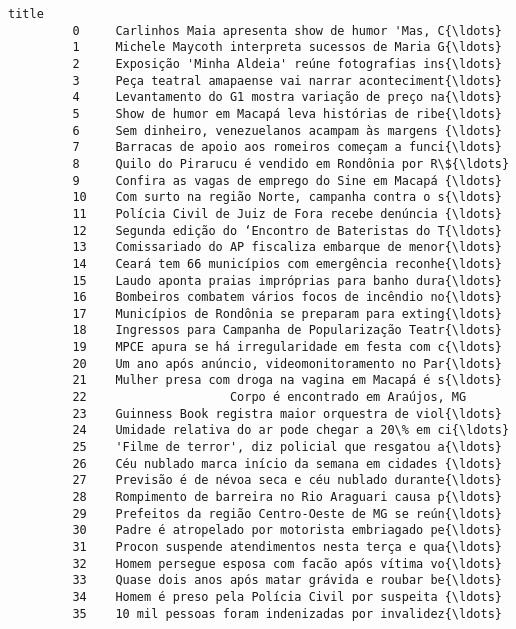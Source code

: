 \documentclass[11pt]{article}
\begin{document}
\begin{Verbatim}[commandchars=\\\{\}]
                                                           title  
         0     Carlinhos Maia apresenta show de humor 'Mas, C{\ldots}  
         1     Michele Maycoth interpreta sucessos de Maria G{\ldots}  
         2     Exposição 'Minha Aldeia' reúne fotografias ins{\ldots}  
         3     Peça teatral amapaense vai narrar aconteciment{\ldots}  
         4     Levantamento do G1 mostra variação de preço na{\ldots}  
         5     Show de humor em Macapá leva histórias de ribe{\ldots}  
         6     Sem dinheiro, venezuelanos acampam às margens {\ldots}  
         7     Barracas de apoio aos romeiros começam a funci{\ldots}  
         8     Quilo do Pirarucu é vendido em Rondônia por R\${\ldots}  
         9     Confira as vagas de emprego do Sine em Macapá {\ldots}  
         10    Com surto na região Norte, campanha contra o s{\ldots}  
         11    Polícia Civil de Juiz de Fora recebe denúncia {\ldots}  
         12    Segunda edição do ‘Encontro de Bateristas do T{\ldots}  
         13    Comissariado do AP fiscaliza embarque de menor{\ldots}  
         14    Ceará tem 66 municípios com emergência reconhe{\ldots}  
         15    Laudo aponta praias impróprias para banho dura{\ldots}  
         16    Bombeiros combatem vários focos de incêndio no{\ldots}  
         17    Municípios de Rondônia se preparam para exting{\ldots}  
         18    Ingressos para Campanha de Popularização Teatr{\ldots}  
         19    MPCE apura se há irregularidade em festa com c{\ldots}  
         20    Um ano após anúncio, videomonitoramento no Par{\ldots}  
         21    Mulher presa com droga na vagina em Macapá é s{\ldots}  
         22                    Corpo é encontrado em Araújos, MG  
         23    Guinness Book registra maior orquestra de viol{\ldots}  
         24    Umidade relativa do ar pode chegar a 20\% em ci{\ldots}  
         25    'Filme de terror', diz policial que resgatou a{\ldots}  
         26    Céu nublado marca início da semana em cidades {\ldots}  
         27    Previsão é de névoa seca e céu nublado durante{\ldots}  
         28    Rompimento de barreira no Rio Araguari causa p{\ldots}  
         29    Prefeitos da região Centro-Oeste de MG se reún{\ldots}  
         30    Padre é atropelado por motorista embriagado pe{\ldots}  
         31    Procon suspende atendimentos nesta terça e qua{\ldots}  
         32    Homem persegue esposa com facão após vítima vo{\ldots}  
         33    Quase dois anos após matar grávida e roubar be{\ldots}  
         34    Homem é preso pela Polícia Civil por suspeita {\ldots}  
         35    10 mil pessoas foram indenizadas por invalidez{\ldots}  

\end{Verbatim}
\end{document}

